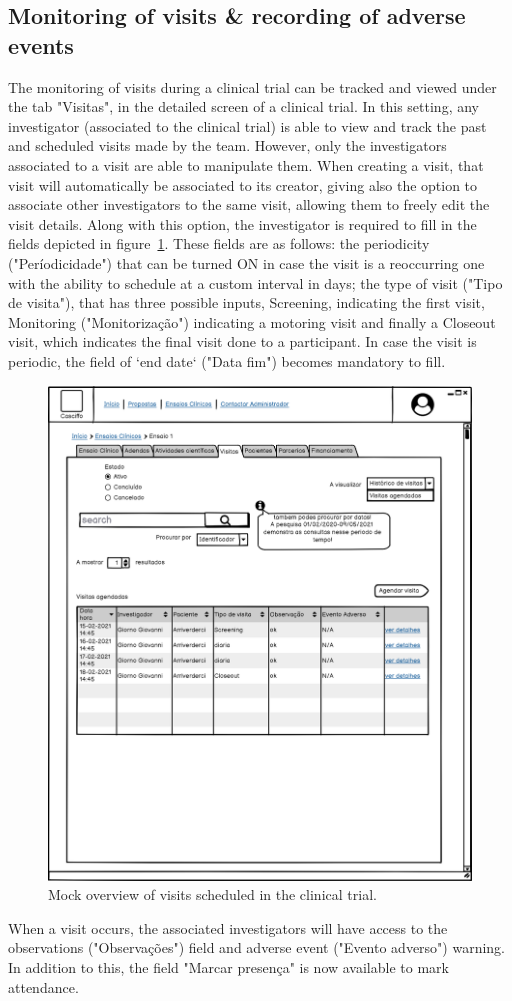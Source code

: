 \subsection{Monitoring of visits \& recording of adverse events} 
The monitoring of visits during a clinical trial can be tracked and viewed under the tab "Visitas", in the detailed screen of a clinical trial.
In this setting, any investigator (associated to the clinical trial) is able to view and track the past and scheduled visits made by the team. However, only the investigators associated to a visit are able to manipulate them. When creating a visit, that visit will automatically be associated to its creator, giving also the option to associate other investigators to the same visit, allowing them to freely edit the visit details. Along with this option, the investigator is required to fill in the fields depicted in figure~\ref{fig:ensaio-visitas}. These fields are as follows: the periodicity ("Períodicidade") that can be turned ON in case the visit is a reoccurring one with the ability to schedule at a custom interval in days; the type of visit ("Tipo de visita"), that has three possible inputs, Screening, indicating the first visit, Monitoring ("Monitorização") indicating a motoring visit and finally a Closeout visit, which indicates the final visit done to a participant. In case the visit is periodic, the field of `end date` ("Data fim") becomes mandatory to fill.  

\begin{figure}[H]
    \centering
    \includegraphics[scale=0.35]{images/ensaio-visitas.png}
    \caption{Mock overview of visits scheduled in the clinical trial.}
    \label{fig:ensaio-visitas}
\end{figure}

When a visit occurs, the associated investigators will have access to the observations ("Observações") field and adverse event ("Evento adverso") warning. In addition to this, the field "Marcar presença" is now available to mark attendance.